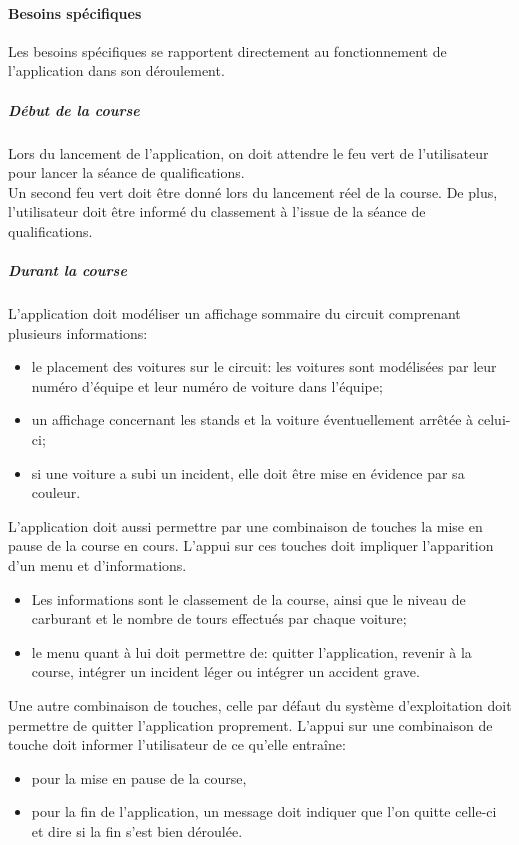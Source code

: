 \documentclass[a4paper, 11pt]{article}
\begin{document}
			\paragraph{Besoins spécifiques\\}
			
			Les besoins spécifiques se rapportent directement au fonctionnement de l'application dans son déroulement.
			
				\subparagraph{Début de la course}
				Lors du lancement de l'application, on doit attendre le feu vert de l'utilisateur pour lancer la séance de qualifications. \\
				Un second feu vert doit être donné lors du lancement réel de la course. De plus, l'utilisateur doit être informé du classement à l'issue de la séance de qualifications.
			
			
				\subparagraph{Durant la course}
				
				L'application doit modéliser un affichage sommaire du circuit comprenant plusieurs informations:
				\begin{itemize}
					\item le placement des voitures sur le circuit: les voitures sont modélisées par leur numéro d'équipe et leur numéro de voiture dans l'équipe;
					\item un affichage concernant les stands et la voiture éventuellement arrêtée à celui-ci;
					\item si une voiture a subi un incident, elle doit être mise en évidence par sa couleur.\\
				\end{itemize}
				
				L'application doit aussi permettre par une combinaison de touches la mise en pause de la course en cours. L'appui sur ces touches doit impliquer l'apparition d'un menu et d'informations.
				\begin{itemize}
					\item Les informations sont le classement de la course, ainsi que le niveau de carburant et le nombre de tours effectués par chaque voiture;
					\item le menu quant à lui doit permettre de: quitter l'application, revenir à la course, intégrer un incident léger ou intégrer un accident grave.
\end{itemize}			

				Une autre combinaison de touches, celle par défaut du système d'exploitation doit permettre de quitter l'application proprement. L'appui sur une combinaison de touche doit informer l'utilisateur de ce qu'elle entraîne:
				\begin{itemize}
					\item pour la mise en pause de la course, 
					\item pour la fin de l'application, un message doit indiquer que l'on quitte celle-ci et dire si la fin s'est bien déroulée.\\
				\end{itemize}
			
\end{document}
